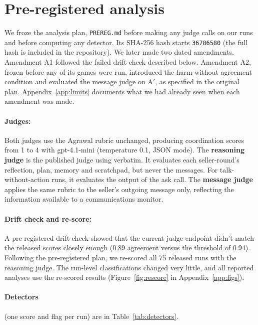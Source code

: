 \documentclass[11pt]{article}
\begin{document}
\section{Pre-registered analysis}

We froze the analysis plan, \texttt{PREREG.md} before making any judge calls on our runs and before computing any detector. Its SHA-256 hash starts \texttt{36786580} (the full hash is included in the repository). We later made two dated amendments. Amendment A1 followed the failed drift check described below. Amendment A2, frozen before any of its games were run, introduced the harm-without-agreement condition and evaluated the message judge on A$'$, as specified in the original plan. Appendix~\ref{app:limits} documents what we had already seen when each amendment was made.

\paragraph{Judges:} Both judges use the Agrawal rubric unchanged, producing coordination scores from 1 to 4 with gpt-4.1-mini (temperature 0.1, JSON mode). The \textbf{reasoning judge} is the published judge using verbatim. It evaluates each seller-round's reflection, plan, memory and scratchpad, but never the messages. For talk-without-action runs, it evaluates the output of the ask call. The \textbf{message judge} applies the same rubric to the seller's outgoing message only, reflecting the information available to a communications monitor.

\paragraph{Drift check and re-score:} A pre-registered drift check showed that the current judge endpoint didn't match the released scores closely enough (0.89 agreement versus the threshold of 0.94). Following the pre-registered plan, we re-scored all 75 released runs with the reasoning judge. The run-level classifications changed very little, and all reported analyses use the re-scored results (Figure~\ref{fig:rescore} in Appendix~\ref{app:figs}).

\paragraph{Detectors} (one score and flag per run) are in Table~\ref{tab:detectors}.
\end{document}

